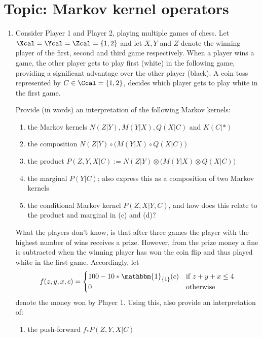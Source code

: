 

\section*{Topic: Markov kernel operators}

\begin{enumerate}[label=3.\arabic*]
    \item
    Consider Player 1 and Player 2, playing multiple games of chess. Let $\Xcal = \Ycal = \Zcal = \{1,2\}$ and let $X, Y$ and $Z$ denote the winning player of the first, second and third game respectively. When a player wins a game, the other player gets to play first (white) in the following game, providing a significant advantage over the other player (black). A coin toss represented by $C \in \Ccal = \{1,2\}$, decides which player gets to play white in the first game.

    Provide (in words) an interpretation of the following Markov kernels:
    \begin{enumerate}
        \item the Markov kernels $N(Z|Y), M(Y|X), Q(X|C)$ and $K(C|*)$
        \item the composition $N(Z|Y) \circ \big(M(Y|X)\circ Q(X|C)\big)$
        \item the product $P(Z, Y, X|C) := N(Z|Y) \otimes \big(M(Y|X)\otimes Q(X|C)\big)$
        \item the marginal $P(Y|C)$; also express this as a composition of two Markov kernels
        \item the conditional Markov kernel $P(Z,X|Y,C)$, and how does this relate to the product and marginal in (c) and (d)?
    \end{enumerate}
    What the players don't know, is that after three games the player with the highest number of wins receives a prize. However, from the prize money a fine is subtracted when the winning player has won the coin flip and thus played white in the first game. Accordingly, let
    $$f(z,y,x, c) = \begin{cases} 100 - 10*\mathbbm{1}_{\{1\}}(c) & \text{if $z+y+x \leq 4$} \\ 0 &\text{otherwise}\end{cases}$$
    denote the money won by Player 1. Using this, also provide an interpretation of:
    \begin{enumerate}
        \item[(f)] the push-forward $f_*P(Z, Y, X|C)$
    \end{enumerate}


\end{enumerate}
